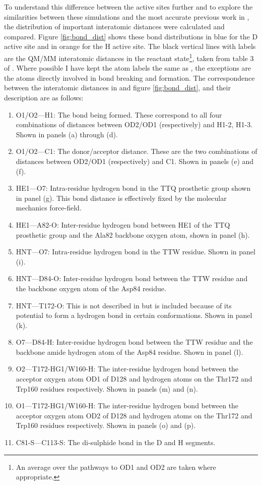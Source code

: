 To understand this difference between the active sites further and to explore the similarities between these simulations and the most accurate previous work in \cite{ranaghanInitioQMMM2017}, the distribution of important interatomic distances were calculated and compared. Figure \ref{fig:bond_dist} shows these bond distributions in blue for the D active site and in orange for the H active site. The black vertical lines with labels are the QM/MM interatomic distances in the reactant state\footnote{An average over the pathways to OD1 and OD2 are taken where appropriate.}, taken from table 3 of \cite{ranaghanInitioQMMM2017}. Where possible I have kept the atom labels the same as \cite{ranaghanInitioQMMM2017}, the exceptions are the atoms directly involved in bond breaking and formation. The correspondence between the interatomic distances in \cite{ranaghanInitioQMMM2017} and figure \ref{fig:bond_dist}, and their description are as follows: 
\begin{enumerate}
    \item O1/O2---H1:  The bond being formed. These correspond to all four combinations of distances between OD2/OD1 (respectively) and H1-2, H1-3. Shown in panels (a) through (d). 
    \item O1/O2---C1: The donor/acceptor distance. These are the two combinations of distances between OD2/OD1 (respectively) and C1. Shown in panels (e) and (f). 
    \item HE1---O7: Intra-residue hydrogen bond in the TTQ prosthetic group shown in panel (g). This bond distance is effectively fixed by the molecular mechanics force-field. \label{he1_07}
    \item HE1---A82-O: Inter-residue hydrogen bond between HE1 of the TTQ prosthetic group and the Ala82 backbone oxygen atom, shown in panel (h). 
    \item HNT---O7: Intra-residue hydrogen bond in the TTW residue. Shown in panel (i). 
    \item HNT---D84-O: Inter-residue hydrogen bond between the TTW residue and the backbone oxygen atom of the Asp84 residue. 
    \item HNT---T172-O: This is not described in \cite{ranaghanInitioQMMM2017} but is included because of its potential to form a hydrogen bond in certain conformations. Shown in panel (k). 
    \item O7---D84-H: Inter-residue hydrogen bond between the TTW residue and the backbone amide hydrogen atom of the Asp84 residue. Shown in panel (l). 
    \item O2---T172-HG1/W160-H: The inter-residue hydrogen bond between the acceptor oxygen atom OD1 of D128 and hydrogen atoms on the Thr172 and Trp160 residues respectively. Shown in panels (m) and (n).
    \item O1---T172-HG1/W160-H: The inter-residue hydrogen bond between the acceptor oxygen atom OD2 of D128 and hydrogen atoms on the Thr172 and Trp160 residues respectively. Shown in panels (o) and (p).\label{o1_t172}
    \item C81-S---C113-S: The di-sulphide bond in the D and H segments.\label{cs_cs} 
\end{enumerate}

